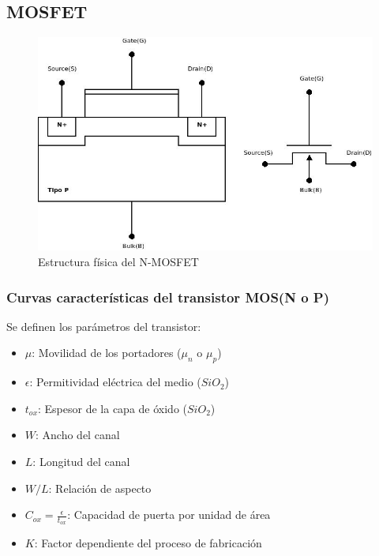 \documentclass[oneside]{book}
\numberwithin{equation}{section}
\numberwithin{figure}{section}
\numberwithin{table}{section}
\begin{document}
			\subsection{MOSFET}
			
				\begin{figure}[H]
					\begin{center}
						\includegraphics[scale=0.4]{N-MOSFET.jpeg}
						\caption{Estructura física del N-MOSFET}
					\end{center}
				\end{figure}	
				
			\subsubsection{Curvas características del transistor MOS(N o P) }
				
				Se definen los parámetros del transistor:
				
				\begin{itemize}
					\item $\mu$: Movilidad de los portadores ($\mu_n$ o $\mu_p$)
					\item $\epsilon$: Permitividad eléctrica del medio ($SiO_2$)
					\item $t_{ox}$: Espesor de la capa de óxido ($SiO_2$)
					\item $W$: Ancho del canal
					\item $L$: Longitud del canal
					\item $W/L$: Relación de aspecto
					\item $C_{ox}=\frac{\epsilon}{t_{ox}}$: Capacidad de puerta por unidad de área
					\item $K$: Factor dependiente del proceso de fabricación
				\end{itemize}						
				
\end{document}
